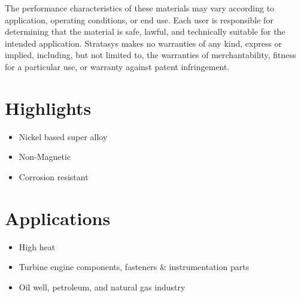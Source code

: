 \documentclass[10pt]{article}
\begin{document}
The performance characteristics of these materials may vary according to application, operating conditions, or end use. Each user is responsible for determining that the material is safe, lawful, and technically suitable for the intended application. Stratasys makes no warranties of any kind, express or implied, including, but not limited to, the warranties of merchantability, fitness for a particular use, or warranty against patent infringement.

\section*{Highlights}
\begin{itemize}
  \item Nickel based super alloy

  \item Non-Magnetic

  \item Corrosion resistant

\end{itemize}

\section*{Applications}
\begin{itemize}
  \item High heat

  \item Turbine engine components, fasteners \& instrumentation parts

  \item Oil well, petroleum, and natural gas industry

\end{itemize}
\end{document}
